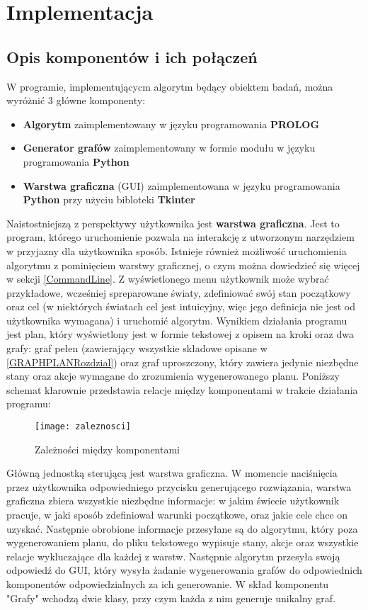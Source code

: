 \chapter{Implementacja}
\thispagestyle{chapterBeginStyle}

\section{Opis komponentów i ich połączeń}
    W programie, implementującycm algorytm będący obiektem badań, można wyróżnić 3 główne komponenty:
    \begin{itemize}
        \item \textbf{Algorytm} zaimplementowany w języku programowania \textbf{PROLOG}
        \item \textbf{Generator grafów} zaimplementowany w formie modułu w języku programowania \textbf{Python}
        \item \textbf{Warstwa graficzna} (GUI) zaimplementowana w języku programowania \textbf{Python} przy użyciu bibloteki \textbf{Tkinter}
    \end{itemize}
    Naistostniejszą z perspektywy użytkownika jest \textbf{warstwa graficzna}. Jest to program, którego uruchomienie pozwala na 
    interakcję z utworzonym narzędziem w przyjazny dla użytkownika sposób. Istnieje również możliwość uruchomienia algorytmu z pominięciem 
    warstwy graficznej, o czym można dowiedzieć się więcej w sekcji \ref{CommandLine}.
    Z wyświetlonego menu użytkownik może wybrać przykładowe, wcześniej spreparowane światy, zdefiniować swój stan początkowy oraz cel (w niektórych 
    światach cel jest intuicyjny, więc jego definicja nie jest od użytkownika wymagana) i uruchomić algorytm. Wynikiem działania programu jest 
    plan, który wyświetlony jest w formie tekstowej z opisem na kroki oraz dwa grafy: graf pełen (zawierający wszystkie składowe opisane 
    w \ref{GRAPHPLANRozdzial}) oraz graf uproszczony, który zawiera jedynie niezbędne stany oraz akcje wymagane do zrozumienia wygenerowanego planu.
    Poniższy schemat klarownie przedstawia relacje między komponentami w trakcie działania programu:
    \begin{figure}[H]
        \texttt{[image: zaleznosci]}
        \centering
        \caption{Zależności między komponentami}
    \end{figure}
    Główną jednostką sterującą jest warstwa graficzna. W momencie naciśnięcia przez użytkownika odpowiedniego przycisku generującego rozwiązania, warstwa 
    graficzna zbiera wszystkie niezbędne informacje: w jakim świecie użytkownik pracuje, w jaki sposób zdefiniował warunki początkowe, oraz jakie cele 
    chce on uzyskać. Następnie obrobione informacje przesyłane są do algorytmu, który poza wygenerowaniem planu, do pliku tekstowego wypisuje 
    stany, akcje oraz wszystkie relacje wykluczające dla każdej z warstw. Następnie algorytm przesyła swoją odpowiedź do GUI, 
    który wysyła żadanie wygenerowania grafów do odpowiednich komponentów odpowiedzialnych za ich 
    generowanie. W skład komponentu "Grafy" wchodzą dwie klasy, przy czym każda z nim generuje unikalny graf.

